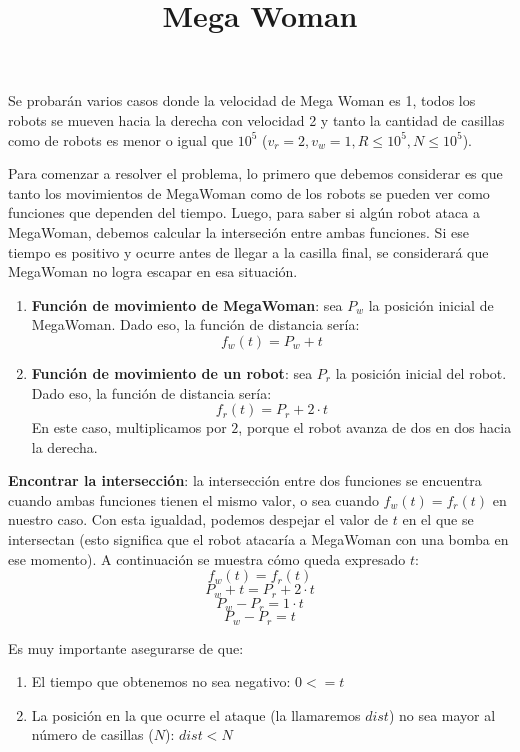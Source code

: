 \documentclass{oci}
\title{Mega Woman}
\begin{document}
\begin{problemDescription}
\end{problemDescription}

\begin{scoreDescription}
   Se probarán varios casos donde la velocidad de Mega Woman es 1,
  todos los robots se mueven hacia la derecha con velocidad 2 y tanto la
  cantidad de casillas como de robots es menor o igual que $10^5$ ($v_r=2, v_w=1,
  R\leq 10^5, N\leq 10^5$).

  Para comenzar a resolver el problema, lo primero que debemos considerar es que
  tanto los movimientos de MegaWoman como de los robots se pueden ver como funciones
  que dependen del tiempo. Luego, para saber si alg\'un robot ataca a MegaWoman,
  debemos calcular la interseci\'on entre ambas funciones. Si ese tiempo es positivo
  y ocurre antes de llegar a la casilla final, se considerar\'a que MegaWoman no 
  logra escapar en esa situaci\'on.

  \begin{enumerate}
    \item \textbf{Funci\'on de movimiento de MegaWoman}: sea $P_w$ la posici\'on
    inicial de MegaWoman. Dado eso, la funci\'on
    de distancia ser\'ia:
    $$f_w(t) = P_w + t$$
    \item \textbf{Funci\'on de movimiento de un robot}: sea $P_r$ la posici\'on
    inicial del robot. Dado eso, la funci\'on
    de distancia ser\'ia:
    $$f_r(t) = P_r + 2 \cdot t$$
    En este caso, multiplicamos por $2$, porque el robot avanza de dos en dos hacia la
    derecha.
  \end{enumerate}

  \textbf{Encontrar la intersecci\'on}: la intersecci\'on entre dos funciones se
  encuentra cuando ambas funciones tienen el mismo valor, o sea cuando 
  $f_w(t) = f_r(t)$ en nuestro caso. Con esta igualdad, podemos despejar el valor
  de $t$ en el que se intersectan (esto significa que el robot atacar\'ia a MegaWoman 
  con una bomba en ese momento). A continuaci\'on se muestra c\'omo queda expresado $t$:
  $$ f_w(t) = f_r(t) $$
  $$ P_w + t = P_r + 2 \cdot t $$
  $$ P_w - P_r =  1 \cdot t $$
  $$ P_w - P_r =  t $$

  Es muy importante asegurarse de que:
  \begin{enumerate}
    \item El tiempo que obtenemos no sea negativo: $0 <= t$
    \item La posici\'on en la que ocurre el ataque (la llamaremos $dist$) no sea 
    mayor al\\ n\'umero de casillas ($N$): $dist < N $ 
  \end{enumerate}


\end{scoreDescription}
\end{document}
